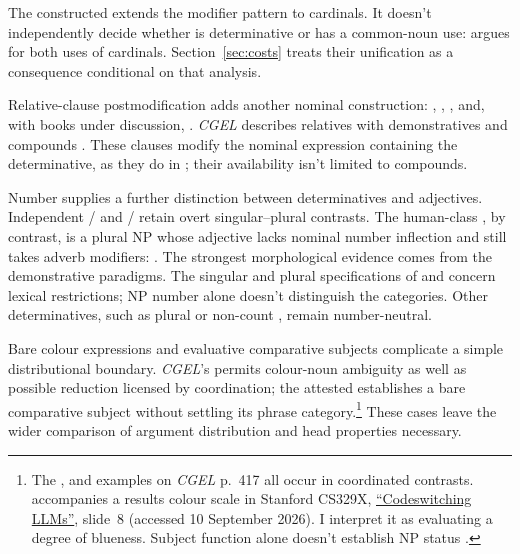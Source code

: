 \documentclass[12pt]{article}
\begin{document}
The constructed  extends the modifier pattern to cardinals. It doesn't independently decide whether  is determinative or has a common-noun use: \textcite{reynolds2026numerals} argues for both uses of cardinals. Section~\ref{sec:costs} treats their unification as a consequence conditional on that analysis.

Relative-clause postmodification adds another nominal construction: , , , and, with books under discussion, . \textit{CGEL} describes relatives with demonstratives and compounds \citep[414, 422--423]{huddleston2002}. These clauses modify the nominal expression containing the determinative, as they do in ; their availability isn't limited to compounds.

Number supplies a further distinction between determinatives and adjectives. Independent /\allowbreak{} and /\allowbreak{} retain overt singular--plural contrasts. The human-class , by contrast, is a plural NP whose adjective lacks nominal number inflection and still takes adverb modifiers:  \citep[418]{huddleston2002}. The strongest morphological evidence comes from the demonstrative paradigms. The singular and plural specifications of  and  concern lexical restrictions; NP number alone doesn't distinguish the categories. Other determinatives, such as plural or non-count , remain number-neutral.

Bare colour expressions and evaluative comparative subjects complicate a simple distributional boundary. \textit{CGEL}'s  permits colour-noun ambiguity as well as possible reduction licensed by coordination; the attested  establishes a bare comparative subject without settling its phrase category.\footnote{The ,  and  examples on \textit{CGEL} p.~417 all occur in coordinated contrasts.  accompanies a results colour scale in Stanford CS329X, \href{https://web.stanford.edu/class/cs329x/slides/Lecture12_B_Codeswitching\%20LLMs.pdf}{\enquote{Codeswitching LLMs}}, slide~8 (accessed 10 September 2026). I interpret it as evaluating a degree of blueness. Subject function alone doesn't establish NP status \citep[236]{huddleston2002}.} These cases leave the wider comparison of argument distribution and head properties necessary.
\end{document}
